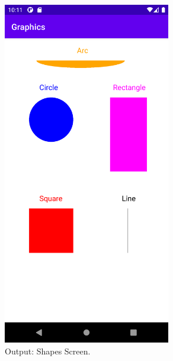 \documentclass[12pt, a4]{article}
\begin{document}
\newpage
\subsection*{}
\begin{figure}[h]
\centering
\caption{Output: Shapes Screen.}
\includegraphics[height=15cm, width=7.3cm]{Graphics/Screenshots/Graphics-2.png}
\end{figure}

\newpage
\end{document}
